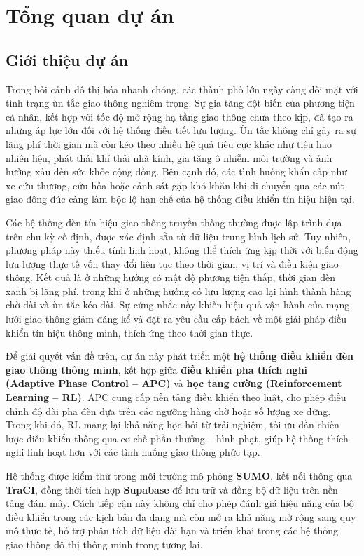 \chapter{Tổng quan dự án}

\section{Giới thiệu dự án}
Trong bối cảnh đô thị hóa nhanh chóng, các thành phố lớn ngày càng đối mặt với tình trạng ùn tắc giao thông nghiêm trọng. Sự gia tăng đột biến của phương tiện cá nhân, kết hợp với tốc độ mở rộng hạ tầng giao thông chưa theo kịp, đã tạo ra những áp lực lớn đối với hệ thống điều tiết lưu lượng. Ùn tắc không chỉ gây ra sự lãng phí thời gian mà còn kéo theo nhiều hệ quả tiêu cực khác như tiêu hao nhiên liệu, phát thải khí thải nhà kính, gia tăng ô nhiễm môi trường và ảnh hưởng xấu đến sức khỏe cộng đồng. Bên cạnh đó, các tình huống khẩn cấp như xe cứu thương, cứu hỏa hoặc cảnh sát gặp khó khăn khi di chuyển qua các nút giao đông đúc càng làm bộc lộ hạn chế của hệ thống điều khiển tín hiệu hiện tại.

Các hệ thống đèn tín hiệu giao thông truyền thống thường được lập trình dựa trên chu kỳ cố định, được xác định sẵn từ dữ liệu trung bình lịch sử. Tuy nhiên, phương pháp này thiếu tính linh hoạt, không thể thích ứng kịp thời với biến động lưu lượng thực tế vốn thay đổi liên tục theo thời gian, vị trí và điều kiện giao thông. Kết quả là ở những hướng có mật độ phương tiện thấp, thời gian đèn xanh bị lãng phí, trong khi ở những hướng có lưu lượng cao lại hình thành hàng chờ dài và ùn tắc kéo dài. Sự cứng nhắc này khiến hiệu quả vận hành của mạng lưới giao thông giảm đáng kể và đặt ra yêu cầu cấp bách về một giải pháp điều khiển tín hiệu thông minh, thích ứng theo thời gian thực.

Để giải quyết vấn đề trên, dự án này phát triển một \textbf{hệ thống điều khiển đèn giao thông thông minh}, kết hợp giữa \textbf{điều khiển pha thích nghi (Adaptive Phase Control – APC)} và \textbf{học tăng cường (Reinforcement Learning – RL)}. APC cung cấp nền tảng điều khiển theo luật, cho phép điều chỉnh độ dài pha đèn dựa trên các ngưỡng hàng chờ hoặc số lượng xe dừng. Trong khi đó, RL mang lại khả năng học hỏi từ trải nghiệm, tối ưu dần chiến lược điều khiển thông qua cơ chế phần thưởng – hình phạt, giúp hệ thống thích nghi linh hoạt hơn với các tình huống giao thông phức tạp.

Hệ thống được kiểm thử trong môi trường mô phỏng \textbf{SUMO}, kết nối thông qua \textbf{TraCI}, đồng thời tích hợp \textbf{Supabase} để lưu trữ và đồng bộ dữ liệu trên nền tảng đám mây. Cách tiếp cận này không chỉ cho phép đánh giá hiệu năng của bộ điều khiển trong các kịch bản đa dạng mà còn mở ra khả năng mở rộng sang quy mô thực tế, hỗ trợ phân tích dữ liệu dài hạn và triển khai trong các hệ thống giao thông đô thị thông minh trong tương lai.

